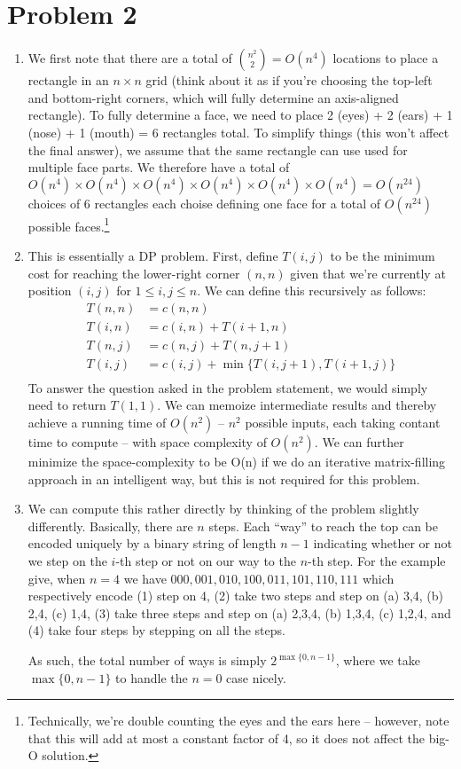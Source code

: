 \documentclass[12pt]{article}
\begin{document}
\section*{Problem 2}

\begin{enumerate}[label=(\alph*)]
  \item We first note that there are a total of ${n^2 \choose 2} = O(n^4)$ locations to place a rectangle in an $n \times n$ grid (think about it as if you're choosing the top-left and bottom-right corners, which will fully determine an axis-aligned rectangle). To fully determine a face, we need to place 2 (eyes) + 2 (ears) + 1 (nose) + 1 (mouth) = 6 rectangles total. To simplify things (this won't affect the final answer), we assume that the same rectangle can use used for multiple face parts. We therefore have a total of $O(n^4)\times O(n^4) \times O(n^4) \times O(n^4) \times O(n^4) \times O(n^4)  = O(n^24)$ choices of 6 rectangles each choise defining one face for a total of $O(n^24)$ possible faces.\footnote{Technically, we're double counting the eyes and the ears here -- however, note that this will add at most a constant factor of 4, so it does not affect the big-O solution.}

  \item This is essentially a DP problem. First, define $T(i,j)$ to be the minimum cost for reaching the lower-right corner $(n,n)$ given that we're currently at position $(i,j)$ for $1 \leq i, j\leq n$. We can define this recursively as follows:
  \begin{align*}
    T(n,n) &= c(n,n) \\
    T(i,n) &= c(i,n) + T(i + 1, n) \\
    T(n,j) &= c(n,j) + T(n, j + 1) \\ 
    T(i,j) &= c(i,j) + \min\{ T(i, j+1), T(i+1, j) \} \\
  \end{align*}
  To answer the question asked in the problem statement, we would simply need to return $T(1,1)$. We can memoize intermediate results and thereby achieve a running time of $O(n^2)$ -- $n^2$ possible inputs, each taking contant time to compute -- with space complexity of $O(n^2)$. We can further minimize the space-complexity to be O(n) if we do an iterative matrix-filling approach in an intelligent way, but this is not required for this problem.

  \item We can compute this rather directly by thinking of the problem slightly differently. Basically, there are $n$ steps. Each ``way'' to reach the top can be encoded uniquely by a binary string of length $n-1$ indicating whether or not we step on the $i$-th step or not on our way to the $n$-th step. For the example give, when $n = 4$ we have $000, 001, 010, 100, 011, 101, 110, 111$ which respectively encode (1) step on 4, (2) take two steps and step on (a) 3,4, (b) 2,4, (c) 1,4, (3) take three steps and step on (a) 2,3,4, (b) 1,3,4, (c) 1,2,4, and (4) take four steps by stepping on all the steps.

  As such, the total number of ways is simply $2^{\max\{0, n-1\}}$, where we take $\max\{0, n-1\}$ to handle the $n = 0$ case nicely.
\end{enumerate}
\end{document}
